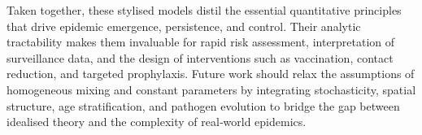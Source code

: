 \documentclass[11pt]{article}
\begin{document}
Taken together, these stylised models distil the essential quantitative
principles that drive epidemic emergence, persistence, and control. Their
analytic tractability makes them invaluable for rapid risk assessment,
interpretation of surveillance data, and the design of interventions such as
vaccination, contact reduction, and targeted prophylaxis. Future work should
relax the assumptions of homogeneous mixing and constant parameters by
integrating stochasticity, spatial structure, age stratification, and pathogen
evolution to bridge the gap between idealised theory and the complexity of
real‐world epidemics.




\end{document}
